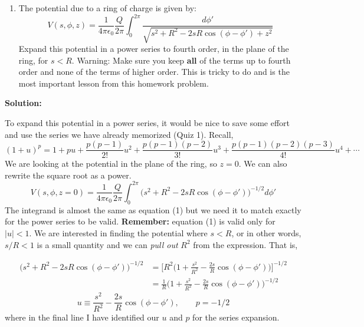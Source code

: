 \documentclass[a4paper, 11pt]{article}
\newenvironment{solution}{%
	\begin{list}{}{%
			\setlength{\topsep}{0pt}%
			\setlength{\leftmargin}{0.5cm}%
			\setlength{\rightmargin}{0.5cm}%
			\setlength{\listparindent}{\parindent}%
			\setlength{\itemindent}{\parindent}%
			\setlength{\parsep}{\parskip}%
		}%
		\item[]}{\end{list}}
\begin{document}
\begin{enumerate}[leftmargin=0em, label=\textbf{\arabic*}.]
  \item The potential due to a ring of charge is given by:
    \[
      V(s,\phi,z) = \frac{1}{4\pi\epsilon_0}\frac{Q}{2\pi}\int_0^{2\pi}\frac{d\phi'}{\sqrt{s^2+R^2-2sR\cos(\phi-\phi')+z^2}}
    \]
    Expand this potential in a power series to fourth order, in the plane of the
    ring, for $s<R$. Warning: Make sure you keep \textbf{all} of the terms up to
    fourth order and none of the terms of higher order. This is tricky to do and
    is the most important lesson from this homework problem. \\
\end{enumerate}

\noindent\textbf{Solution:}
\begin{solution}
  \noindent To expand this potential in a power series, it would be nice to save
  some effort and use the series we have already memorized (Quiz 1). Recall,
  \begin{equation}
    (1+u)^p = 1+pu + \frac{p(p-1)}{2!}u^2+\frac{p(p-1)(p-2)}{3!}u^3+\frac{p(p-1)(p-2)(p-3)}{4!}u^4+ \cdots
  \end{equation}
  We are looking at the potential in the plane of the ring, so $z=0$. We can
  also rewrite the square root as a power.
  \begin{equation}
    V(s,\phi,z=0)=\frac{1}{4\pi\epsilon_0}\frac{Q}{2\pi}\int_0^{2\pi}\Big(s^2+R^2-2sR\cos(\phi-\phi')\Big)^{-1/2}d\phi'
  \end{equation}
  The integrand is almost the same as equation (1) but we need it to match
  exactly for the power series to be valid. \textbf{Remember:} equation (1) is
  valid only for $|u|<1$. We are interested in finding the potential where
  $s<R$, or in other words, $s/R<1$ is a small quantity and we can \textit{pull
    out} $R^2$ from the expression. That is,
  
  \begin{align}
    \Big(s^2+R^2-2sR\cos(\phi-\phi')\Big)^{-1/2} &= \Big[R^2\Big(1+\frac{s^2}{R^2}-\frac{2s}{R}\cos(\phi-\phi')\Big)\Big]^{-1/2}\\
                                                 &= \frac{1}{R}\Big(1+\frac{s^2}{R^2}-\frac{2s}{R}\cos(\phi-\phi')\Big)^{-1/2} 
  \end{align}
  \begin{equation}
    u \equiv \frac{s^2}{R^2}-\frac{2s}{R}\cos(\phi-\phi'), \qquad p=-1/2
  \end{equation}
  where in the final line I have identified our $u$ and $p$ for the series
  expansion. \\
  

\end{solution}
\end{document}
